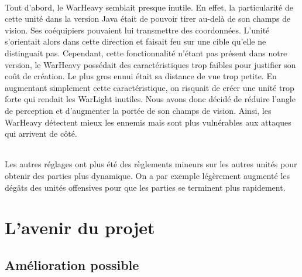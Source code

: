 \documentclass{report}
\begin{document}
\paragraph{}
Tout d’abord, le WarHeavy semblait presque inutile. En effet, la particularité de cette unité dans la version Java était de pouvoir tirer au-delà de son champs de vision. Ses coéquipiers pouvaient lui transmettre des coordonnées. L’unité s’orientait alors dans cette direction et faisait feu sur une cible qu’elle ne distinguait pas. Cependant, cette fonctionnalité n’étant pas présent dans notre version, le WarHeavy possédait des caractéristiques trop faibles pour justifier son coût de création. Le plus gros ennui était sa distance de vue trop petite. En augmentant simplement cette caractéristique, on risquait de créer une unité trop forte qui rendait les WarLight inutiles. \newline
Nous avons donc décidé de réduire l’angle de perception et d’augmenter la portée de son champs de vision. Ainsi, les WarHeavy détectent mieux les ennemis mais sont plus vulnérables aux attaques qui arrivent de côté.
\paragraph{}
Les autres réglages ont plus été des règlements mineurs sur les autres unités pour obtenir des parties plus dynamique. On a par exemple légèrement augmenté les dégâts des unités offensives pour que les parties se terminent plus rapidement.


\newpage
\part{L'avenir du projet}
\chapter{Amélioration possible}

%
%
\end{document}
